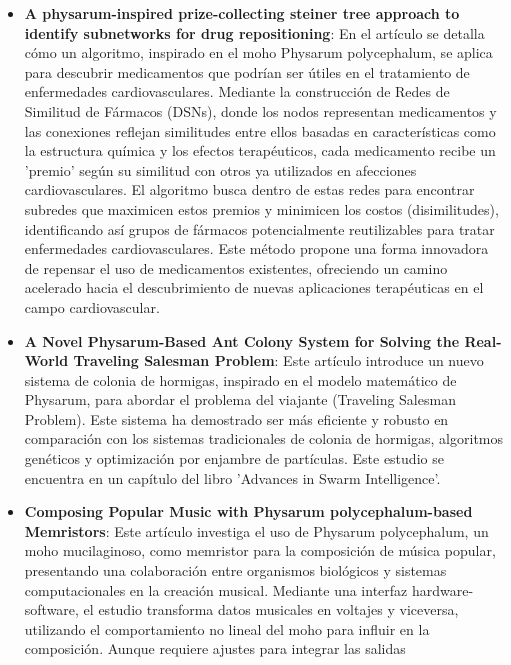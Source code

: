     \begin{itemize}
        \item \textbf{A physarum-inspired prize-collecting steiner tree approach to identify subnetworks for drug repositioning}:
            En el art\'iculo se detalla c\'omo un algoritmo, inspirado en el moho Physarum polycephalum, se aplica para descubrir medicamentos 
            que podr\'ian ser \'utiles en el tratamiento de enfermedades cardiovasculares. Mediante la construcci\'on de Redes de Similitud de F\'armacos 
            (DSNs), donde los nodos representan medicamentos y las conexiones reflejan similitudes entre ellos basadas en caracter\'isticas como la 
            estructura qu\'imica y los efectos terap\'euticos, cada medicamento recibe un 'premio' seg\'un su similitud con otros ya utilizados en afecciones 
            cardiovasculares. El algoritmo busca dentro de estas redes para encontrar subredes que maximicen estos premios y minimicen los costos 
            (disimilitudes), identificando as\'i grupos de f\'armacos potencialmente reutilizables para tratar enfermedades cardiovasculares. 
            Este m\'etodo propone una forma innovadora de repensar el uso de medicamentos existentes, ofreciendo un camino acelerado hacia el 
            descubrimiento de nuevas aplicaciones terap\'euticas en el campo cardiovascular. \cite{Sun2016}
        \item \textbf{A Novel Physarum-Based Ant Colony System for Solving the Real-World Traveling Salesman Problem}:
            Este art\'iculo introduce un nuevo sistema de colonia de hormigas, inspirado en el modelo matem\'atico de Physarum, 
            para abordar el problema del viajante (Traveling Salesman Problem). Este sistema ha demostrado ser m\'as eficiente y 
            robusto en comparaci\'on con los sistemas tradicionales de colonia de hormigas, algoritmos gen\'eticos y optimizaci\'on por 
            enjambre de part\'iculas. Este estudio se encuentra en un cap\'itulo del libro 'Advances in Swarm Intelligence'. \cite{Yuxiao2014} 
        \item \textbf{Composing Popular Music with Physarum polycephalum-based Memristors}: Este art\'iculo investiga el uso de Physarum polycephalum, 
            un moho mucilaginoso, como memristor para la composici\'on de m\'usica popular, presentando una colaboraci\'on entre organismos biol\'ogicos y 
            sistemas computacionales en la creaci\'on musical. Mediante una interfaz hardware-software, el estudio transforma datos musicales en voltajes 
            y viceversa, utilizando el comportamiento no lineal del moho para influir en la composici\'on. Aunque requiere ajustes para integrar las salidas 

\end{itemize}
